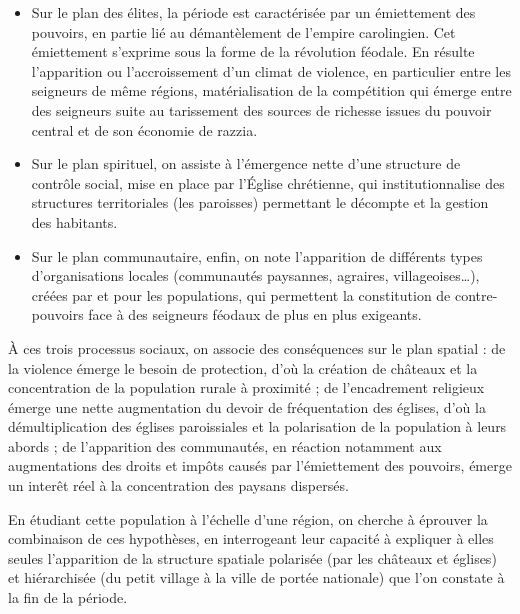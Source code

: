 \begin{itemize}
	\item Sur le plan des élites, la période est caractérisée par un émiettement des pouvoirs, en partie lié au démantèlement de l'empire carolingien.
	Cet émiettement s'exprime sous la forme de la \og révolution féodale\fg{}.
	En résulte l'apparition ou l'accroissement d'un climat de violence, en particulier entre les seigneurs de même régions, matérialisation de la compétition qui émerge entre des seigneurs suite au tarissement des sources de richesse issues du pouvoir central et de son économie de razzia.
	\item Sur le plan spirituel, on assiste à l'émergence nette d'une structure de contrôle social, mise en place par l'Église chrétienne, qui institutionnalise des structures territoriales (les paroisses) permettant le décompte et la gestion des habitants.
	\item Sur le plan communautaire, enfin, on note l'apparition de différents types d'organisations locales (communautés paysannes, agraires, villageoises\ldots), créées par et pour les populations, qui permettent la constitution de contre-pouvoirs face à des seigneurs féodaux de plus en plus exigeants.
\end{itemize}

À ces trois processus sociaux, on associe des conséquences sur le plan spatial : de la violence émerge le besoin de protection, d'où la création de châteaux et la concentration de la population rurale à proximité ; de l'encadrement religieux émerge une nette augmentation du devoir de fréquentation des églises, d'où la démultiplication des églises paroissiales et la polarisation de la population à leurs abords ; de l'apparition des communautés, en réaction notamment aux augmentations des droits et impôts causés par l'émiettement des pouvoirs, émerge un interêt réel à la concentration des paysans dispersés.

En étudiant cette population à l'échelle d'une région, on cherche à éprouver la combinaison de ces hypothèses, en interrogeant leur capacité à expliquer à elles seules l'apparition de la structure spatiale polarisée (par les châteaux et églises) et hiérarchisée (du petit village à la ville de portée nationale) que l'on constate à la fin de la période.


